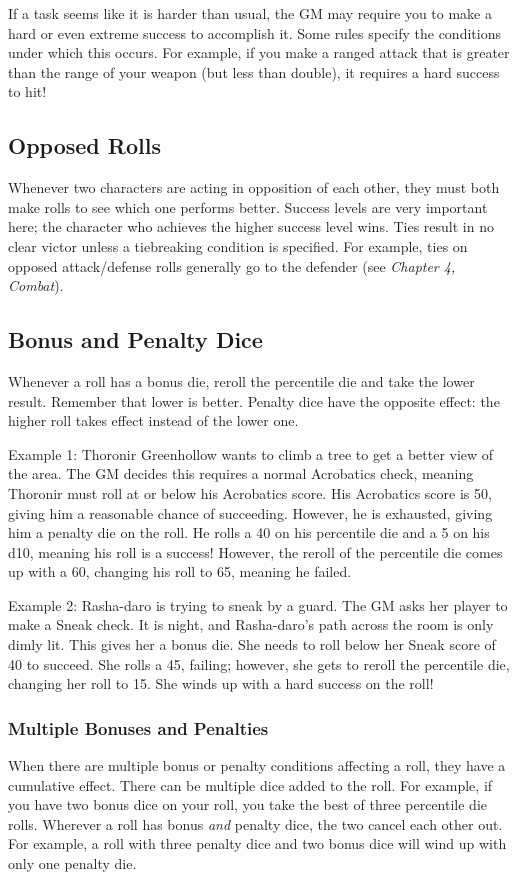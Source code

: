 \documentclass[12pt]{book}
\begin{document}
If a task seems like it is harder than usual, the GM may require you to make a hard or even extreme success to accomplish it. Some rules specify the conditions under which this occurs. For example, if you make a ranged attack that is greater than the range of your weapon (but less than double), it requires a hard success to hit!

\subsection{Opposed Rolls}
Whenever two characters are acting in opposition of each other, they must both make rolls to see which one performs better. Success levels are very important here; the character who achieves the higher success level wins. Ties result in no clear victor unless a tiebreaking condition is specified. For example, ties on opposed attack/defense rolls generally go to the defender (see \textit{Chapter 4, Combat}).

\subsection{Bonus and Penalty Dice}
Whenever a roll has a bonus die, reroll the percentile die and take the lower result. Remember that lower is better. Penalty dice have the opposite effect: the higher roll takes effect instead of the lower one.

Example 1: Thoronir Greenhollow wants to climb a tree to get a better view of the area. The GM decides this requires a normal Acrobatics check, meaning Thoronir must roll at or below his Acrobatics score. His Acrobatics score is 50, giving him a reasonable chance of succeeding. However, he is exhausted, giving him a penalty die on the roll. He rolls a 40 on his percentile die and a 5 on his d10, meaning his roll is a success! However, the reroll of the percentile die comes up with a 60, changing his roll to 65, meaning he failed.

Example 2: Rasha-daro is trying to sneak by a guard. The GM asks her player to make a Sneak check. It is night, and Rasha-daro's path across the room is only dimly lit. This gives her a bonus die. She needs to roll below her Sneak score of 40 to succeed. She rolls a 45, failing; however, she gets to reroll the percentile die, changing her roll to 15. She winds up with a hard success on the roll!

\subsubsection{Multiple Bonuses and Penalties}
When there are multiple bonus or penalty conditions affecting a roll, they have a cumulative effect. There can be multiple dice added to the roll. For example, if you have two bonus dice on your roll, you take the best of three percentile die rolls. Wherever a roll has bonus \textit{and} penalty dice, the two cancel each other out. For example, a roll with three penalty dice and two bonus dice will wind up with only one penalty die.
\end{document}
